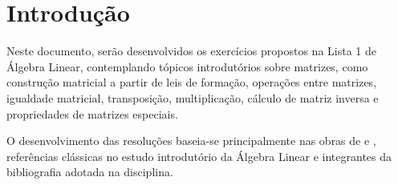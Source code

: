 \section{Introdução}

Neste documento, serão desenvolvidos os exercícios propostos na Lista 1 de
Álgebra Linear, contemplando tópicos introdutórios sobre matrizes, como
construção matricial a partir de leis de formação, operações entre matrizes,
igualdade matricial, transposição, multiplicação, cálculo de matriz inversa e
propriedades de matrizes especiais.

O desenvolvimento das resoluções baseia-se principalmente nas obras de
\citeauthor{steinbruch_linear} \cite{steinbruch_linear} e
\citeauthor{boldrini_linear} \cite{boldrini_linear}, referências clássicas no
estudo introdutório da Álgebra Linear e integrantes da bibliografia adotada na
disciplina.
